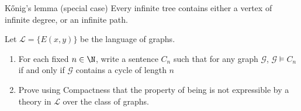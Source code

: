 \documentclass[a4paper, 12pt]{report}
\begin{document}
    \begin{framedlem}{Kőnig's lemma (special case)}
        Every infinite tree contains either a vertex of infinite degree, or an infinite path.
    \end{framedlem}

    \newpage

    \begin{framedprob}{}
        Let $\mathcal L = \{E(x, y)\}$ be the language of graphs.

        \begin{enumerate}
            \item For each fixed $n \in \N$, write a sentence $C_n$ such that for any graph $\mathcal G$, $\mathcal G \models C_n$ if and only if $\mathcal G$ contains a cycle of length $n$
            \item Prove using Compactness that the property of being  is not expressible by a theory in $\mathcal L$ over the class of graphs.
        \end{enumerate}
    \end{framedprob}
\end{document}
